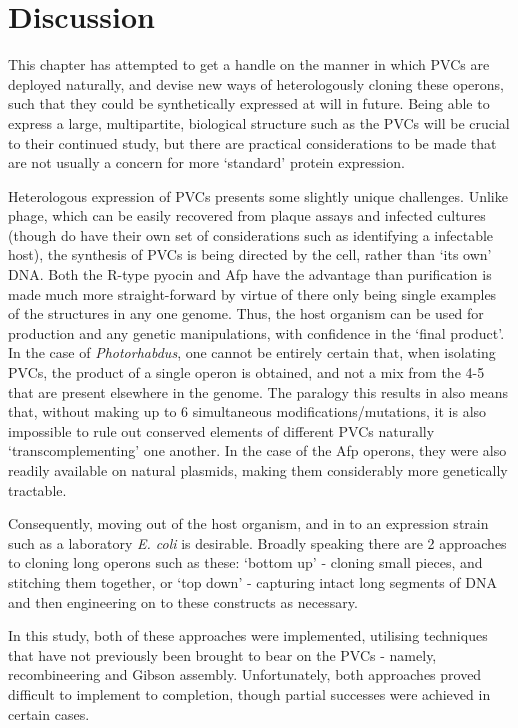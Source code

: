 \clearpage
\section{Discussion}

This chapter has attempted to get a handle on the manner in which PVCs are deployed naturally, and devise new ways of heterologously cloning these operons, such that they could be synthetically expressed at will in future. Being able to express a large, multipartite, biological structure such as the PVCs will be crucial to their continued study, but there are practical considerations to be made that are not usually a concern for more `standard' protein expression.

Heterologous expression of PVCs presents some slightly unique challenges. Unlike phage, which can be easily recovered from plaque assays and infected cultures (though do have their own set of considerations such as identifying a infectable host), the synthesis of PVCs is being directed by the cell, rather than `its own' DNA. Both the R-type pyocin and Afp have the advantage than purification is made much more straight-forward by virtue of there only being single examples of the structures in any one genome. Thus, the host organism can be used for production and any genetic manipulations, with confidence in the `final product'. In the case of \emph{Photorhabdus}, one cannot be entirely certain that, when isolating PVCs, the product of a single operon is obtained, and not a mix from the 4-5 that are present elsewhere in the genome. The paralogy this results in also means that, without making up to 6 simultaneous modifications/mutations, it is also impossible to rule out conserved elements of different PVCs naturally `transcomplementing' one another. In the case of the Afp operons, they were also readily available on natural plasmids, making them considerably more genetically tractable.

Consequently, moving out of the host organism, and in to an expression strain such as a laboratory \emph{E. coli} is desirable. Broadly speaking there are 2 approaches to cloning long operons such as these: `bottom up' - cloning small pieces, and stitching them together, or `top down' - capturing intact long segments of DNA and then engineering on to these constructs as necessary.

In this study, both of these approaches were implemented, utilising techniques that have not previously been brought to bear on the PVCs - namely, recombineering and Gibson assembly. Unfortunately, both approaches proved difficult to implement to completion, though partial successes were achieved in certain cases.

